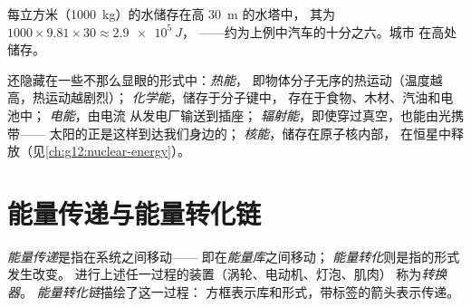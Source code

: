 \begin{example}[水塔]\label{ex:g10:energy-conservation:potential}
每立方米（\qty{1000}{kg}）的水储存在高 \qty{30}{m} 的水塔中，
其为 $1000 \times 9.81 \times 30 \approx \qty{2.9e5}{J}$，
——约为上例中汽车的十分之六。城市
在高处储存。
\end{example}

\begin{definition}[其他形式]\label{def:g10:energy-conservation:forms}
还隐藏在一些不那么显眼的形式中：\emph{热能}，
即物体分子无序的热运动（温度越高，热运动越剧烈）；
\emph{化学能}，储存于分子键中，
存在于食物、木材、汽油和电池中；
\emph{电能}，由电流
从发电厂输送到插座；
\emph{辐射能}，即使穿过真空，也能由光携带——
太阳的正是这样到达我们身边的；
\emph{核能}，储存在原子核内部，
在恒星中释放（见\cref{ch:g12:nuclear-energy}）。
\end{definition}

\section{能量传递与能量转化链}

\begin{definition}\label{def:g10:energy-conservation:transfer}
\emph{能量传递}是指在系统之间移动——
即在\emph{能量库}之间移动；
\emph{能量转化}则是指的形式发生改变。
进行上述任一过程的装置（涡轮、电动机、灯泡、肌肉）
称为\emph{转换器}。
\emph{能量转化链}描绘了这一过程：
方框表示库和形式，带标签的箭头表示传递。
\end{definition}

